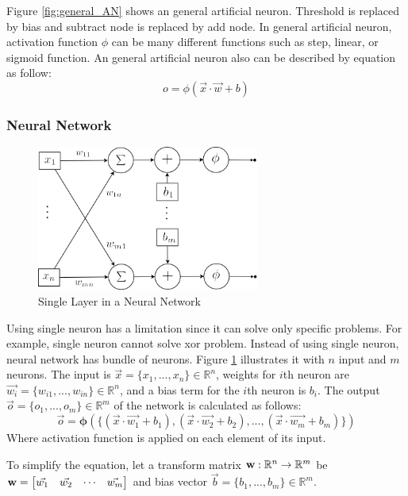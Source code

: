 \documentclass[draft,dvipsnames]{drexel-thesis}
\begin{document}
\begin{thesis}
Figure \ref{fig:general_AN} shows an general artificial neuron. Threshold is replaced by bias and subtract node is replaced by add node. In general artificial neuron, activation function $\phi$ can be many different functions such as step, linear, or sigmoid function. An general artificial neuron also can be described by equation as follow:
$$o = \phi(\vec{x}\cdot\vec{w}+b)$$


\subsubsection{Neural Network}\label{subsubsec:NN}

\begin{figure}[t!]
    \centering
    \includegraphics[width=0.65\textwidth]{pictures/figures/detail_NN.png}
    \caption{Single Layer in a Neural Network}
    \label{fig:detail_NN}
\end{figure}

Using single neuron has a limitation since it can solve only specific problems. For example, single neuron cannot solve xor problem. Instead of using single neuron, neural network has bundle of neurons. Figure \ref{fig:detail_NN} illustrates it with $n$ input and $m$ neurons. The input is $\vec{x} = \{x_1, ..., x_n\} \in \mathbb{R}^n$, weights for $i$th neuron are $\vec{w_i} = \{w_{i1}, ..., w_{in}\} \in \mathbb{R}^n$, and a bias term for the $i$th neuron is $b_i$. The output $\vec{o} = \{o_1, ..., o_m\} \in \mathbb{R}^m$ of the network is calculated as follows:
$$\vec{o} = \bm{\phi}(\{(\vec{x}\cdot\vec{w_1}+b_1),(\vec{x}\cdot\vec{w_2}+b_2),...,(\vec{x}\cdot\vec{w_m}+b_m)\})$$
Where activation function is applied on each element of its input.

To simplify the equation, let a transform matrix $\bold{w}: \mathbb{R}^n \rightarrow \mathbb{R}^m$ be
$\bold{w}=
\begin{bmatrix}
	\vec{w_1} & \vec{w_2} & \cdots & \vec{w_m}
\end{bmatrix}$
and bias vector $\vec{b} = \{b_1, ..., b_m\} \in \mathbb{R}^m$.


\end{thesis}
\end{document}
